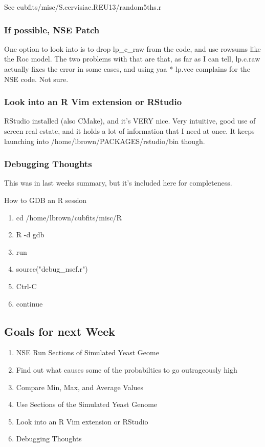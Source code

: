 See cubfits/misc/S.cervisiae.REU13/random5ths.r


\subsubsection{If possible, NSE Patch}

One option to look into is to drop lp\_c\_raw from the code, and use rowsums like the Roc model. The two problems with that are that, as far as I can tell, lp.c.raw actually fixes the error in some cases, and using yaa * lp.vec complains for the NSE code. Not sure.

\subsubsection{Look into an R Vim extension or RStudio}

RStudio installed (also CMake), and it's VERY nice. Very intuitive, good use of screen real estate, and it holds a lot of information that I need at once. It keeps launching into /home/lbrown/PACKAGES/rstudio/bin though.

\subsubsection{Debugging Thoughts}

This was in last weeks summary, but it's included here for completeness.

How to GDB an R session
\begin{enumerate}
\item cd /home/lbrown/cubfits/misc/R
\item R -d gdb
\item run
\item source("debug\_nsef.r")
\item Ctrl-C
\item continue
\end{enumerate}



\subsection{Goals for next Week}
\begin{enumerate}
\item NSE Run Sections of Simulated Yeast Geome
\item Find out what causes some of the probabilties to go outrageously high
\item Compare Min, Max, and Average Values
\item Use Sections of the Simulated Yeast Genome
\item Look into an R Vim extension or RStudio
\item Debugging Thoughts
\end{enumerate}


 
